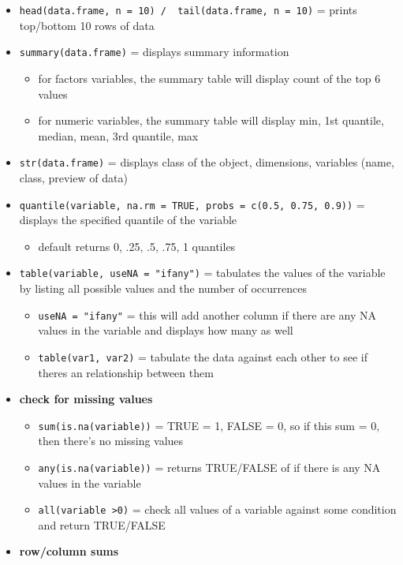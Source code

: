 \documentclass[
]{article}
\providecommand{\tightlist}{%
  \setlength{\itemsep}{0pt}\setlength{\parskip}{0pt}}
\begin{document}
\begin{itemize}
\tightlist
\item
  \texttt{head(data.frame,\ n\ =\ 10)\ /\ \ tail(data.frame,\ n\ =\ 10)}
  = prints top/bottom 10 rows of data
\item
  \texttt{summary(data.frame)} = displays summary information

  \begin{itemize}
  \tightlist
  \item
    for factors variables, the summary table will display count of the
    top 6 values
  \item
    for numeric variables, the summary table will display min, 1st
    quantile, median, mean, 3rd quantile, max
  \end{itemize}
\item
  \texttt{str(data.frame)} = displays class of the object, dimensions,
  variables (name, class, preview of data)
\item
  \texttt{quantile(variable,\ na.rm\ =\ TRUE,\ probs\ =\ c(0.5,\ 0.75,\ 0.9))}
  = displays the specified quantile of the variable

  \begin{itemize}
  \tightlist
  \item
    default returns 0, .25, .5, .75, 1 quantiles
  \end{itemize}
\item
  \texttt{table(variable,\ useNA\ =\ "ifany")} = tabulates the values of
  the variable by listing all possible values and the number of
  occurrences

  \begin{itemize}
  \tightlist
  \item
    \texttt{useNA\ =\ "ifany"} = this will add another column if there
    are any NA values in the variable and displays how many as well
  \item
    \texttt{table(var1,\ var2)} = tabulate the data against each other
    to see if theres an relationship between them
  \end{itemize}
\item
  \textbf{check for missing values}

  \begin{itemize}
  \tightlist
  \item
    \texttt{sum(is.na(variable))} = TRUE = 1, FALSE = 0, so if this sum
    = 0, then there's no missing values
  \item
    \texttt{any(is.na(variable))} = returns TRUE/FALSE of if there is
    any NA values in the variable
  \item
    \texttt{all(variable\ \textgreater{}0)} = check all values of a
    variable against some condition and return TRUE/FALSE
  \end{itemize}
\item
  \textbf{row/column sums}


\end{itemize}
\end{document}
